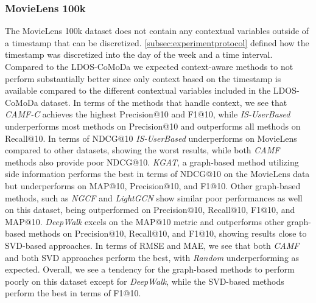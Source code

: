 \subsubsection{MovieLens 100k}
The MovieLens 100k dataset does not contain any contextual variables outside of a timestamp that can be discretized.
\autoref{subsec:experimentprotocol} defined how the timestamp was discretized into the day of the week and a time interval.
Compared to the LDOS-CoMoDa we expected context-aware methods to not perform substantially better since only context based on the timestamp is available compared to the different contextual variables included in the LDOS-CoMoDa dataset. 
In terms of the methods that handle context, we see that \textit{CAMF-C} achieves the highest Precision@10 and F1@10, while \textit{IS-UserBased} underperforms most methods on Precision@10 and outperforms all methods on Recall@10.
In terms of NDCG@10 \textit{IS-UserBased} underperforms on MovieLens compared to other datasets, showing the worst results, while both \textit{CAMF} methods also provide poor NDCG@10.
\textit{KGAT}, a graph-based method utilizing side information performs the best in terms of NDCG@10 on the MovieLens data but underperforms on MAP@10, Precision@10, and F1@10.
Other graph-based methods, such as \textit{NGCF} and \textit{LightGCN} show similar poor performances as well on this dataset, being outperformed on Precision@10, Recall@10, F1@10, and MAP@10.
\textit{DeepWalk} excels on the MAP@10 metric and outperforms other graph-based methods on Precision@10, Recall@10, and F1@10, showing results close to SVD-based approaches.
In terms of RMSE and MAE, we see that both \textit{CAMF} and both SVD approaches perform the best, with \textit{Random} underperforming as expected.
Overall, we see a tendency for the graph-based methods to perform poorly on this dataset except for \textit{DeepWalk}, while the SVD-based methods perform the best in terms of F1@10.

